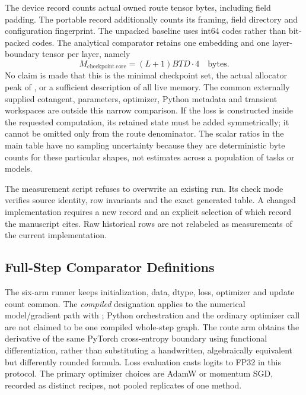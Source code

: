 The device record counts actual owned route tensor bytes, including field
padding. The portable record additionally counts its framing, field
directory and configuration fingerprint. The unpacked baseline uses int64
codes rather than bit-packed codes. The analytical comparator retains one
embedding and one layer-boundary tensor per layer, namely
\begin{equation}
 M_{\mathrm{checkpoint\ core}}=(L+1)BTD\cdot4\quad\text{bytes}.
\end{equation}
No claim is made that this is the minimal checkpoint set, the actual
allocator peak of , or a sufficient description
of all live memory. The common externally supplied cotangent, parameters,
optimizer, Python metadata and transient workspaces are outside this narrow
comparison. If the loss is constructed inside the requested computation,
its retained state must be added symmetrically; it cannot be omitted only
from the route denominator. The scalar ratios in the main table have no
sampling uncertainty because they are deterministic byte counts for these
particular shapes, not estimates across a population of tasks or models.

The measurement script refuses to overwrite an existing run. Its check
mode verifies source identity, row invariants and the exact generated table.
A changed implementation requires a new record and an explicit selection
of which record the manuscript cites. Raw historical rows are not relabeled
as measurements of the current implementation.

\subsection{Full-Step Comparator Definitions}

The six-arm runner keeps initialization, data, dtype, loss, optimizer and
update count common. The \emph{compiled} designation applies to the numerical
model/gradient path with ; Python orchestration and the
ordinary optimizer call are not claimed to be one compiled whole-step graph.
The route arm obtains the derivative of the same PyTorch cross-entropy
boundary using functional differentiation, rather than substituting a
handwritten, algebraically equivalent but differently rounded formula.
Loss evaluation casts logits to FP32 in this protocol. The primary optimizer
choices are AdamW or momentum SGD, recorded as distinct recipes, not pooled
replicates of one method.

